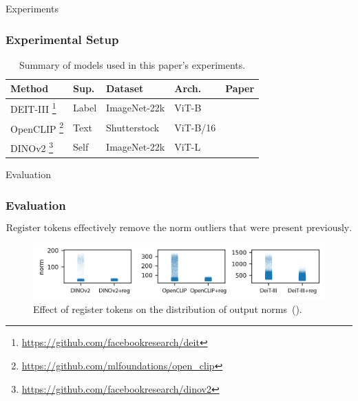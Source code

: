 \documentclass[aspectratio=169]{beamer}
\begin{document}
\begin{section}{Experiments}

\begin{frame}
\frametitle{Experimental Setup}
\vspace{2.3em}
\begin{table}[h]
    \centering
    \caption{Summary of models used in this paper's experiments.}
    \begin{tabular}{lllll}
        \toprule
        Method & Sup. & Dataset & Arch. & Paper \\
        \midrule
        DEIT-III \footnote{\url{https://github.com/facebookresearch/deit}} & Label & ImageNet-22k & ViT-B & \cite{touvronDeiTIIIRevenge2022} \\
        OpenCLIP \footnote{\url{https://github.com/mlfoundations/open_clip}} & Text & Shutterstock & ViT-B/16 & \cite{ilharco_gabriel_2021_5143773} \\
        DINOv2 \footnote{\url{https://github.com/facebookresearch/dinov2}} & Self & ImageNet-22k & ViT-L & \cite{oquabDINOv2LearningRobust2024} \\
        \bottomrule
    \end{tabular}
    \label{tab:methods}
\end{table}
\end{frame}

\begin{subsection}{Evaluation}

\begin{frame}
\frametitle{Evaluation}
\vspace{2em}

$$
\boxed{\text{Register tokens effectively remove the norm outliers that were present previously.}}
$$

\vspace{2em}
\begin{figure}[t]
    \centering
    \includegraphics[width=\textwidth]{resources/fig_norm_distrib_before_after_stripplot-2.png}
    \caption{
      Effect of register tokens on the distribution of output norms~(\cite{darcetVisionTransformersNeed2024}).
    }
    \label{fig:norm_distrib_before_after}
\end{figure}


\end{frame}
\end{subsection}
\end{section}
\end{document}
